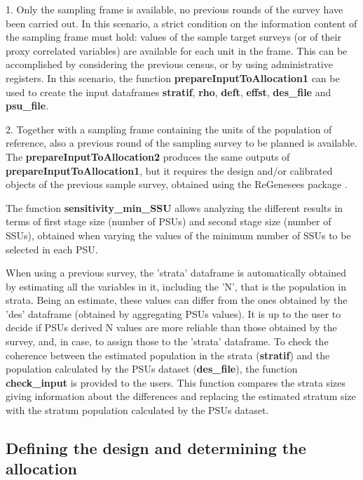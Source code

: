 1. Only the sampling frame is available, no previous rounds of the survey have been carried out. In this scenario, a strict condition on the information content of the sampling frame must hold: values of the sample target surveys (or of their proxy correlated variables) are available for each unit in the frame. This can be accomplished by considering the previous census, or by using administrative registers. In this scenario, the function \textbf{prepareInputToAllocation1} can be used to create the input dataframes \textbf{stratif}, \textbf{rho}, \textbf{deft}, \textbf{effst}, \textbf{des\_file} and \textbf{psu\_file}.  

2. Together with a sampling frame containing the units of the population of reference, also a previous round of the sampling survey to be planned is available. The \textbf{prepareInputToAllocation2} produces the same outputs of \textbf{prepareInputToAllocation1}, but it requires the design and/or calibrated objects of the previous sample survey, obtained using the {ReGenesees} package \citep{zardetto2015regenesees}. 

The function \textbf{sensitivity\_min\_SSU} allows analyzing the different results in terms of first stage size (number of PSUs) and second stage size (number of SSUs), obtained when varying the values of the minimum number of SSUs to be selected in each PSU.

When using a previous survey, the 'strata' dataframe is automatically obtained by estimating all the 
variables in it, including the 'N', that is the population in strata. Being an estimate, these values
can differ from the ones obtained by the 'des' dataframe (obtained by aggregating PSUs values). It is up to the user to decide if 
PSUs derived N values are more reliable than those obtained by the survey, and, in case, to assign those
to the 'strata' dataframe. To check the coherence between the estimated population in the strata (\textbf{stratif}) and the population calculated by the PSUs dataset (\textbf{des\_file}), the function \textbf{check\_input} is provided to the users. 
This function compares the strata sizes giving information about the differences and replacing the estimated stratum size with the stratum population calculated by the PSUs dataset.

\subsection{Defining the design and determining the allocation} \label{sec:alloc}

